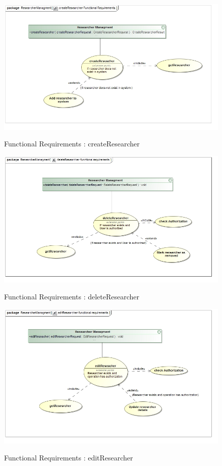 \documentclass{article}
\begin{document}
		\begin{figure}[H]
			\includegraphics[width=\textwidth]{Rohan_Diagrams/createResearcherFunctionalRequirements.jpg}  \\
			\caption{Functional Requirements : createResearcher}
		\end{figure}
		\begin{figure}[H]
			\includegraphics[width=\textwidth]{Rohan_Diagrams/deleteResearcherFunctionalRequirements.jpg}  \\
			\caption{Functional Requirements : deleteResearcher}
		\end{figure}
		\begin{figure}[H]
			\includegraphics[width=\textwidth]{Rohan_Diagrams/editResearcherFunctionalRequirements.jpg}  \\
			\caption{Functional Requirements : editResearcher}
		\end{figure}
	
\end{document}
